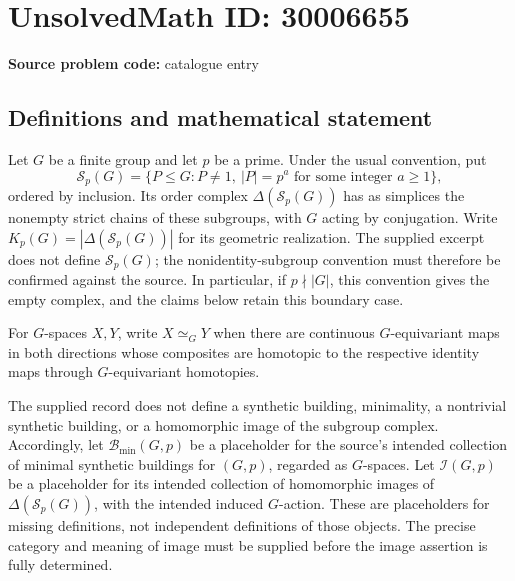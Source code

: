 \documentclass[11pt]{article}
\begin{document}
\section*{UnsolvedMath ID: 30006655}
\textbf{Source problem code:} catalogue entry
\subsection{Definitions and mathematical statement}
Let \(G\) be a finite group and let \(p\) be a prime. Under the usual convention, put
\[
\mathcal S_p(G)=\{P\leq G: P\neq 1,\ |P|=p^a\text{ for some integer }a\geq 1\},
\]
ordered by inclusion. Its order complex \(\Delta(\mathcal S_p(G))\) has as simplices the nonempty strict chains of these subgroups, with \(G\) acting by conjugation. Write \(K_p(G)=|\Delta(\mathcal S_p(G))|\) for its geometric realization. The supplied excerpt does not define \(\mathcal S_p(G)\); the nonidentity-subgroup convention must therefore be confirmed against the source. In particular, if \(p\nmid |G|\), this convention gives the empty complex, and the claims below retain this boundary case.

For \(G\)-spaces \(X,Y\), write \(X\simeq_G Y\) when there are continuous \(G\)-equivariant maps in both directions whose composites are homotopic to the respective identity maps through \(G\)-equivariant homotopies.

The supplied record does not define a synthetic building, minimality, a nontrivial synthetic building, or a homomorphic image of the subgroup complex. Accordingly, let \(\mathscr B_{\min}(G,p)\) be a placeholder for the source's intended collection of minimal synthetic buildings for \((G,p)\), regarded as \(G\)-spaces. Let \(\mathscr I(G,p)\) be a placeholder for its intended collection of homomorphic images of \(\Delta(\mathcal S_p(G))\), with the intended induced \(G\)-action. These are placeholders for missing definitions, not independent definitions of those objects. The precise category and meaning of image must be supplied before the image assertion is fully determined.
\end{document}
